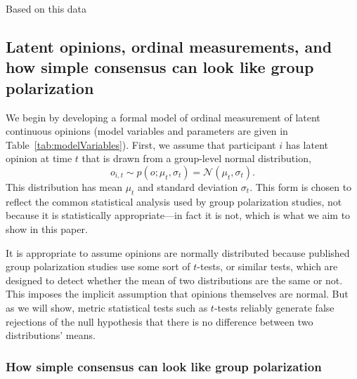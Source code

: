 \documentclass[11pt, letterpaper]{article}
\begin{document}
Based on this data



\subsection{Latent opinions, ordinal measurements, and how simple consensus can look like
group polarization}


We begin by developing a formal model of ordinal measurement of latent continuous
opinions (model variables and parameters are given in Table~\ref{tab:modelVariables}).
First, we assume that participant $i$ has latent opinion at time $t$ that is drawn from
a group-level normal distribution,
\begin{equation}
  o_{i,t} \sim p(o; \mu_t, \sigma_t) = \mathcal{N}(\mu_t, \sigma_t).
  \label{eq:opinionDistribution}
\end{equation}
\noindent 
This distribution has mean $\mu_t$ and standard deviation $\sigma_t$.
This form is chosen to
reflect the common statistical analysis used by group polarization studies,
not because it is statistically appropriate---in fact it is not, which is what
we aim to show in this paper.

It is appropriate to assume opinions are normally distributed because published
group polarization studies use some sort of $t$-tests, or similar tests, which are designed
to detect whether the mean of two distributions are the same or not. This imposes the
implicit assumption that opinions themselves are normal. But as we will show, 
metric statistical tests such as $t$-tests reliably generate false rejections
of the null hypothesis that there is no difference between two distributions' means.

\subsubsection{How simple consensus can look like group polarization}
\end{document}

